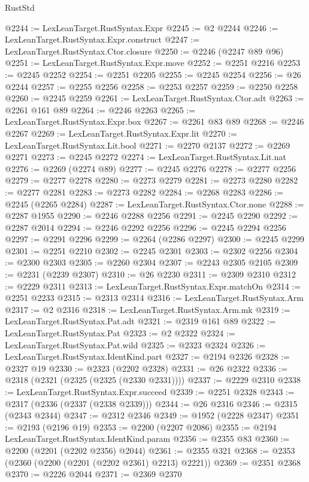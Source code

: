 \begin{lexlean}{RustStd}
\begin{coremodule}
@2244 := LexLeanTarget.RustSyntax.Expr
@2245 := @2 @2244
@2246 := LexLeanTarget.RustSyntax.Expr.construct
@2247 := LexLeanTarget.RustSyntax.Ctor.closure
@2250 := @2246 (@2247 @89 @96)
@2251 := LexLeanTarget.RustSyntax.Expr.move
@2252 := @2251 @2216
@2253 := @2245 @2252
@2254 := @2251 @2205
@2255 := @2245 @2254
@2256 := @26 @2244
@2257 := @2255 @2256
@2258 := @2253 @2257
@2259 := @2250 @2258
@2260 := @2245 @2259
@2261 := LexLeanTarget.RustSyntax.Ctor.adt
@2263 := @2261 @161 @89
@2264 := @2246 @2263
@2265 := LexLeanTarget.RustSyntax.Expr.box
@2267 := @2261 @83 @89
@2268 := @2246 @2267
@2269 := LexLeanTarget.RustSyntax.Expr.lit
@2270 := LexLeanTarget.RustSyntax.Lit.bool
@2271 := @2270 @2137
@2272 := @2269 @2271
@2273 := @2245 @2272
@2274 := LexLeanTarget.RustSyntax.Lit.nat
@2276 := @2269 (@2274 @89)
@2277 := @2245 @2276
@2278 := @2277 @2256
@2279 := @2277 @2278
@2280 := @2273 @2279
@2281 := @2273 @2280
@2282 := @2277 @2281
@2283 := @2273 @2282
@2284 := @2268 @2283
@2286 := @2245 (@2265 @2284)
@2287 := LexLeanTarget.RustSyntax.Ctor.none
@2288 := @2287 @1955
@2290 := @2246 @2288 @2256
@2291 := @2245 @2290
@2292 := @2287 @2014
@2294 := @2246 @2292 @2256
@2296 := @2245 @2294 @2256
@2297 := @2291 @2296
@2299 := @2264 (@2286 @2297)
@2300 := @2245 @2299
@2301 := @2251 @2210
@2302 := @2245 @2301
@2303 := @2302 @2256
@2304 := @2300 @2303
@2305 := @2260 @2304
@2307 := @2243 @2305 @2105
@2309 := @2231 (@2239 @2307)
@2310 := @26 @2230
@2311 := @2309 @2310
@2312 := @2229 @2311
@2313 := LexLeanTarget.RustSyntax.Expr.matchOn
@2314 := @2251 @2233
@2315 := @2313 @2314
@2316 := LexLeanTarget.RustSyntax.Arm
@2317 := @2 @2316
@2318 := LexLeanTarget.RustSyntax.Arm.mk
@2319 := LexLeanTarget.RustSyntax.Pat.adt
@2321 := @2319 @161 @89
@2322 := LexLeanTarget.RustSyntax.Pat
@2323 := @2 @2322
@2324 := LexLeanTarget.RustSyntax.Pat.wild
@2325 := @2323 @2324
@2326 := LexLeanTarget.RustSyntax.IdentKind.part
@2327 := @2194 @2326
@2328 := @2327 @19
@2330 := @2323 (@2202 @2328)
@2331 := @26 @2322
@2336 := @2318 (@2321 (@2325 (@2325 (@2330 @2331))))
@2337 := @2229 @2310
@2338 := LexLeanTarget.RustSyntax.Expr.succeed
@2339 := @2251 @2328
@2343 := @2317 (@2336 (@2337 (@2338 @2339)))
@2344 := @26 @2316
@2346 := @2315 (@2343 @2344)
@2347 := @2312 @2346
@2349 := @1952 (@2228 @2347)
@2351 := @2193 (@2196 @19)
@2353 := @2200 (@2207 @2086)
@2355 := @2194 LexLeanTarget.RustSyntax.IdentKind.param
@2356 := @2355 @83
@2360 := @2200 (@2201 (@2202 @2356) @2044)
@2361 := @2355 @321
@2368 := @2353 (@2360 (@2200 (@2201 (@2202 @2361) @2213) @2221))
@2369 := @2351 @2368
@2370 := @2226 @2044
@2371 := @2369 @2370

\end{coremodule}
\end{lexlean}
